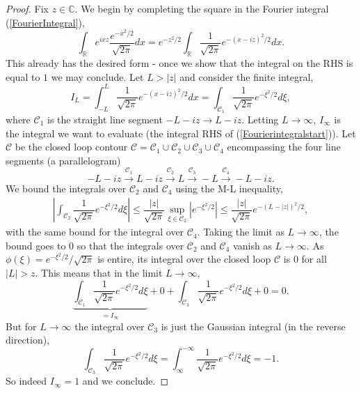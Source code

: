 \documentclass[10pt,a4paper]{amsart}
\begin{document}
\begin{proof}
    Fix $z\in\mathbb{C}$. We begin by completing the square in the Fourier integral (\ref{FourierIntegral}),
    \begin{equation}\label{Fourierintegralstart}
        \int_{\mathbb{R}}e^{ixz}\dfrac{e^{-x^2/2}}{\sqrt{2\pi}}dx = e^{-z^2/2}\int_{\mathbb{R}} \dfrac{1}{\sqrt{2\pi}}e^{-(x-iz)^2/2}dx.
    \end{equation}
    This already has the desired form - once we show that the integral on the RHS is equal to $1$ we may conclude. Let $L>|z|$ and consider the finite integral,
    \begin{equation}
        I_L = \int_{-L}^L \dfrac{1}{\sqrt{2\pi}}e^{-(x-iz)^2/2}dx = \int_{\mathcal{C}_1} \dfrac{1}{\sqrt{2\pi}}e^{-\xi^2/2}d\xi,
    \end{equation}
    where $\mathcal{C}_1$ is the straight line segment $-L-iz\to L-iz$.
    Letting $L\to\infty$, $I_{\infty}$ is the integral we want to evaluate (the integral RHS of (\ref{Fourierintegralstart})). Let $\mathcal{C}$ be the closed loop contour $\mathcal{C} = \mathcal{C}_1\cup \mathcal{C}_2\cup \mathcal{C}_3 \cup \mathcal{C}_4$ encompassing the four line segments (a parallelogram) $$-L-iz\overset{\mathcal{C}_1}{\longrightarrow} L-iz\overset{\mathcal{C}_2}{\longrightarrow} L \overset{\mathcal{C}_3}{\longrightarrow} -L \overset{\mathcal{C}_4}{\longrightarrow} -L-iz.$$ We bound the integrals over $\mathcal{C}_2$ and $\mathcal{C}_4$ using the M-L inequality,
    \begin{align}
        \left|\int_{\mathcal{C}_2}\dfrac{1}{\sqrt{2\pi}}e^{-\xi^2/2}d\xi\right|\leq \dfrac{|z|}{\sqrt{2\pi}}\sup_{\xi\in\mathcal{C}_2}\left|e^{-\xi^2/2}\right|\leq \dfrac{|z|}{\sqrt{2\pi}}e^{-(L-|z|)^2/2},
    \end{align}
    with the same bound for the integral over $\mathcal{C}_4$. Taking the limit as $L\to\infty$, the bound goes to $0$ so that the integrals over $\mathcal{C}_2$ and $\mathcal{C}_4$ vanish as $L\to\infty$.  As $\phi(\xi) = e^{-\xi^2/2}/\sqrt{2\pi}$ is entire, its integral over the closed loop $\mathcal{C}$ is $0$ for all $|L|>z$. This means that in the limit $L\to\infty$,
    \begin{equation}
        \underbrace{\int_{\mathcal{C}_1} \dfrac{1}{\sqrt{2\pi}}e^{-\xi^2/2}d\xi}_{=I_\infty} + 0 + \int_{\mathcal{C}_3}\dfrac{1}{\sqrt{2\pi}}e^{-\xi^2/2}d\xi + 0 = 0.
    \end{equation}
    But for $L\to\infty$ the integral over $\mathcal{C}_3$ is just the Gaussian integral (in the reverse direction),
    \begin{equation}
        \int_{\mathcal{C}_3}\dfrac{1}{\sqrt{2\pi}}e^{-\xi^2/2}d\xi =  \int_{\infty}^{-\infty}\dfrac{1}{\sqrt{2\pi}}e^{-\xi^2/2}d\xi = -1.
    \end{equation}
    So indeed $I_{\infty} = 1$ and we conclude.
\end{proof}
\end{document}
